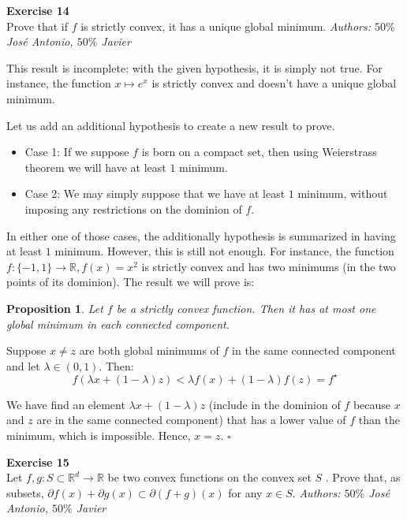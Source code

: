 \documentclass[11pt,table]{article}
\newcommand{\qed}{\hfill $\square$}
\newenvironment{problem}[2][Exercise]
{ \begin{mdframed}[backgroundcolor=gray!20] \textbf{#1 #2} \\}
	{\hspace{0.0cm}\newline\newline \emph{Authors: \(50\%\) José Antonio, \(50\%\) Javier}  \end{mdframed}}
\newtheorem{nprop}{Proposition}
\newcommand\R{\mathbb R}
\begin{document}
\begin{problem}{14}
Prove that if \( f \)  is strictly convex, it has a unique global minimum.
\end{problem}

This result is incomplete: with the given hypothesis, it is simply not true. For instance, the function $x \mapsto e^x$ is strictly convex and doesn't have a unique global minimum.

Let us add an additional hypothesis to create a new result to prove.

\begin{itemize}
	\item Case 1: If we suppose $f$ is born on a compact set, then using Weierstrass theorem we will have at least $1$ minimum.
	\item Case 2: We may simply suppose that we have at least $1$ minimum, without imposing any restrictions on the dominion of $f$.
\end{itemize}

In either one of those cases, the additionally hypothesis is summarized in having at least $1$ minimum. However, this is still not enough. For instance, the function $f:\{-1,1\} \rightarrow \R, f(x) = x^2$ is strictly convex and has two minimums (in the two points of its dominion). The result we will prove is:

\begin{nprop}
	Let \( f \) be a strictly convex function. Then  it has at most one global minimum in each connected component.
\end{nprop}

Suppose $x \neq z$ are both global minimums of $f$ in the same connected component and let $\lambda \in (0,1)$. Then:
\[
	f(\lambda x + (1-\lambda)z) < \lambda f(x) + (1-\lambda) f(z) = f^\star
\]

We have find an element $\lambda x + (1-\lambda)z$ (include in the dominion of $f$ because $x$ and $z$ are in the same connected component) that has a lower value of $f$ than the minimum, which is impossible. Hence, $x = z$. \qed \\

\begin{problem}{15}
Let \( f,g: S \subset \mathbb{R}^d \to \mathbb{R} \)  be two convex functions on the convex set \( S \) . Prove that, as subsets, \(  \partial f(x) + \partial g(x) \subset \partial(f+g)(x) \) for any $x\in S$.
\end{problem}
\end{document}
